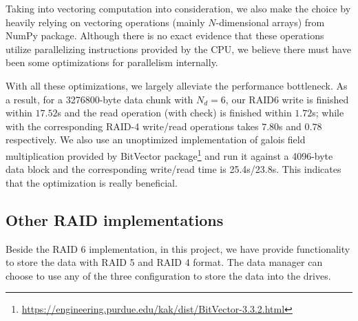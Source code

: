 Taking into vectoring computation into consideration, we also make the choice by heavily relying on vectoring operations (mainly $N$-dimensional arrays) from \textsf{NumPy} package. Although there is no exact evidence that these operations utilize parallelizing instructions provided by the CPU, we believe there must have been some optimizations for parallelism internally.

With all these optimizations, we largely alleviate the performance bottleneck. As a result, for a 3276800-byte data chunk with $N_d=6$, our RAID6 write is finished within $17.52$s and the read operation (with check) is finished within $1.72$s; while with the corresponding RAID-4 write/read operations takes $7.80$s and $0.78$ respectively. We also use an unoptimized implementation of galois field multiplication provided by BitVector package\footnote{\url{https://engineering.purdue.edu/kak/dist/BitVector-3.3.2.html}} and run it against a 4096-byte data block and the corresponding write/read time is 25.4s/23.8s. This indicates that the optimization is really beneficial.


\subsection{Other RAID implementations}

Beside the RAID 6 implementation, in this project, we have provide functionality to store the data with RAID 5 and RAID 4 format. The data manager can choose to use any of the three configuration to store the data into the drives.
